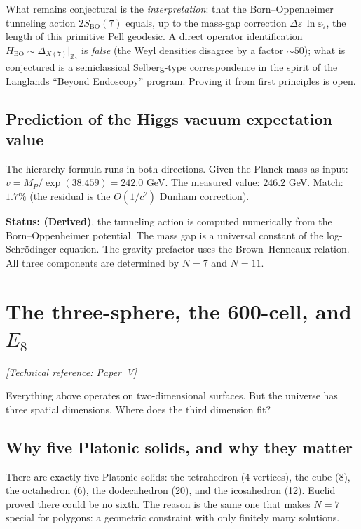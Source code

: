 What remains conjectural is the \emph{interpretation}: that the
Born--Oppenheimer tunneling action $2S_{\mathrm{BO}}(7)$ equals,
up to the mass-gap correction $\Delta\varepsilon\,\ln\varepsilon_7$,
the length of this primitive Pell geodesic. A direct operator
identification $H_{\mathrm{BO}} \sim \Delta_{X(7)}|_{\mathbb{Z}_7}$
is \emph{false} (the Weyl densities disagree by a factor $\sim 50$);
what is conjectured is a semiclassical Selberg-type correspondence
in the spirit of the Langlands ``Beyond Endoscopy'' program.
Proving it from first principles is open.

\subsection*{Prediction of the Higgs vacuum expectation value}

The hierarchy formula runs in both directions. Given the Planck mass
as input: $v = M_P/\exp(38.459) = 242.0$ GeV. The measured value:
$246.2$ GeV. Match: $1.7\%$
(the residual is the $O(1/c^2)$ Dunham correction).

\textbf{Status: (Derived)}, the tunneling action is computed
numerically from the Born--Oppenheimer potential. The mass gap is a
universal constant of the log-Schr\"odinger equation. The gravity
prefactor uses the Brown--Henneaux relation. All three components are
determined by $N = 7$ and $N = 11$.


\section{The three-sphere, the 600-cell, and $E_8$}
\noindent\textit{[Technical reference: Paper~V]}

Everything above operates on two-dimensional surfaces. But the universe
has three spatial dimensions. Where does the third dimension fit?

\subsection*{Why five Platonic solids, and why they matter}

There are exactly five Platonic solids: the tetrahedron (4 vertices),
the cube (8), the octahedron (6), the dodecahedron (20), and the
icosahedron (12). Euclid proved there could be no sixth. The reason
is the same one that makes $N = 7$ special for polygons: a geometric
constraint with only finitely many solutions.

